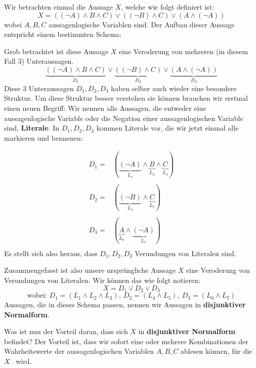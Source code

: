 \documentclass[../../main.tex]{subfiles}
\begin{document}
    \begin{example}{}
        Wir betrachten einmal die Aussage $X$, welche wie folgt definiert ist:
        \[X = ((\lnot A) \land B \land C) \lor ((\lnot B) \land  C) 
        \lor (A \land (\lnot A))\]
        wobei $A,B,C$ aussagenlogische Variablen sind.
        Der Aufbau dieser Aussage entspricht einem bestimmten Schema:

        Grob betrachtet ist diese Aussage $X$ eine Veroderung von 
        mehreren (in diesem Fall 3) Unteraussagen.
        \[\underbrace{((\lnot A) \land B \land C)}_{D_1} \lor \underbrace{((\lnot B) \land 
        C)}_{D_2} \lor \underbrace{(A \land (\lnot A))}_{D_3}\]
        Diese 3 Unteraussagen $D_1,D_2,D_3$ haben selber auch wieder eine besondere Struktur.
        Um diese Struktur besser verstehen sie können brauchen wir erstmal einen neuen Begriff:
        Wir nennen alle Aussagen, die entweder eine aussagenlogische Variable 
        oder die Negation einer
        aussagenlogischen Variable sind, \textbf{Literale}.       
        In $D_1,D_2,D_3$ kommen Literale vor, die wir jetzt
        einmal alle markieren und bennenen:

        \[\begin{array}{cc}
            D_1 = & (\underbrace{(\lnot A)}_{L_1} \land \underbrace{B}_{L_2} \land 
            \underbrace{C}_{L_3})  \\
            \\
            D_2 = & (\underbrace{(\lnot B)}_{L_4} \land \underbrace{C}_{L_5}) \\ \\
            D_3 = & (\underbrace{A}_{L_6} \land \underbrace{(\lnot A)}_{L_7}) \\
        \end{array}\]
        Es stellt sich also heraus, dass 
        $D_1,D_2,D_3$ Verundungen von Literalen sind.

        Zusammengefasst ist also unsere ursprüngliche Aussage $X$
         eine Veroderung von Verundungen von
        Literalen. Wir können das wie folgt notieren:
        \[X = D_1 \lor D_2 \lor D_3\]
        \[\textrm{wobei: }D_1 = (L_1 \land L_2 \land L_3),\  D_2 = (L_4 
        \land L_5),\  D_3 = (L_6 \land L_7)\]
        Aussagen, die in dieses Schema passen, nennen wir 
        Aussagen in \textbf{disjunktiver Normalform}.
 
        Was ist nun der Vorteil daran, dass sich $X$ in
        \textbf{disjunktiver Normalform}
        befindet? Der Vorteil ist, dass wir sofort eine oder mehrere Kombinationen der 
        Wahrheitswerte der
        aussagenlogischen Variablen $A,B,C$ ablesen können, für 
        die $X$ \wahr\ wird. 


\end{example}
\end{document}
